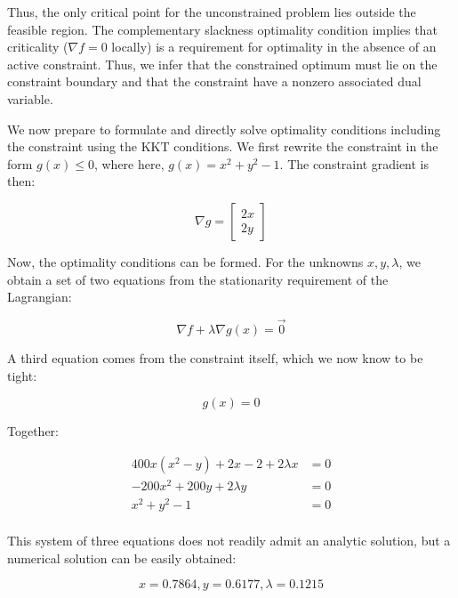 Thus, the only critical point for the unconstrained problem lies outside the feasible region. The complementary slackness optimality condition implies that criticality ($\nabla f = 0$ locally) is a requirement for optimality in the absence of an active constraint. Thus, we infer that the constrained optimum must lie on the constraint boundary and that the constraint have a nonzero associated dual variable.

We now prepare to formulate and directly solve optimality conditions including the constraint using the KKT conditions. We first rewrite the constraint in the form $g(x) \leq 0$, where here, $g(x) = x^2+y^2-1$. The constraint gradient is then:

\begin{equation}
    \nabla g =
    \begin{bmatrix}
        2x \\
        2y
    \end{bmatrix}
\end{equation}

Now, the optimality conditions can be formed. For the unknowns $x, y, \lambda$, we obtain a set of two equations from the stationarity requirement of the Lagrangian:

\begin{equation}
    \nabla f + \lambda \nabla g(x) = \vec{0}
\end{equation}

A third equation comes from the constraint itself, which we now know to be tight:

\begin{equation}
    g(x) = 0
\end{equation}

Together:

\begin{equation}
    \begin{aligned}
        400x(x^2-y)+2x-2+2\lambda x &= 0 \\
        -200x^2 + 200y + 2\lambda y &= 0 \\
        x^2 + y^2 - 1 &= 0 \\
    \end{aligned}
\end{equation}

This system of three equations does not readily admit an analytic solution, but a numerical solution can be easily obtained:

\begin{equation}
    x = 0.7864, y = 0.6177, \lambda = 0.1215
    \label{eq:constrained-rosen-solution}
\end{equation}

